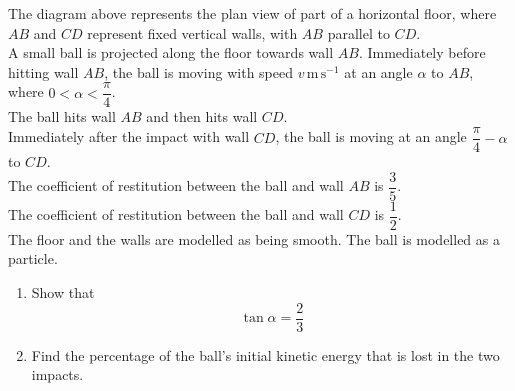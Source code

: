 \documentclass[leqno]{article}
\begin{document}
\begin{enumerate}[
  label=\textbf{\arabic*.},
  leftmargin=*,
  topsep=0pt,
  partopsep=0pt,
  parsep=0pt
]
\begin{figure}[H]
\end{figure}


The diagram above represents the plan view of part of a horizontal floor, where $AB$ and $CD$ represent fixed vertical walls, with $AB$ parallel to $CD$. \\

A small ball is projected along the floor towards wall $AB$. Immediately before hitting wall $AB$, the ball is moving with speed $v\,\mathrm{m\,s^{-1}}$ at an angle $\alpha$ to $AB$, where $0<\alpha<\dfrac{\pi}{4}$. \\

The ball hits wall $AB$ and then hits wall $CD$. \\

Immediately after the impact with wall $CD$, the ball is moving at an angle $\dfrac{\pi}{4}-\alpha$ to $CD$. \\

The coefficient of restitution between the ball and wall $AB$ is $\dfrac{3}{5}$. \\

The coefficient of restitution between the ball and wall $CD$ is $\dfrac{1}{2}$. \\

The floor and the walls are modelled as being smooth. The ball is modelled as a particle. \\

\begin{enumerate}[label=\textbf{(\alph*)}]
  \item Show that
  \[
  \tan\alpha=\dfrac{2}{3}
  \] 
  \item Find the percentage of the ball's initial kinetic energy that is lost in the two impacts.  \\
\end{enumerate}



\end{enumerate}
\end{document}
